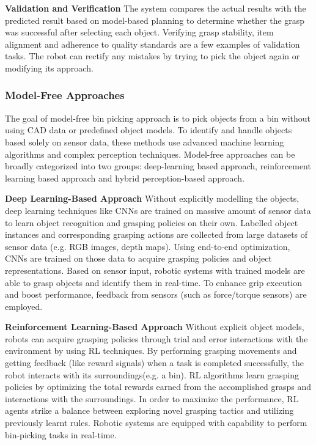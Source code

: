 \vspace{5mm}

\textbf{Validation and Verification} The system compares the actual results with the predicted result based on model-based planning to determine whether the grasp was successful after selecting each object. Verifying grasp stability, item alignment and adherence to quality standards are a few examples of validation tasks. The robot can rectify any mistakes by trying to pick the object again or modifying its approach.\cite{lin2020robotic}

\subsubsection{Model-Free Approaches}
The goal of model-free bin picking approach is to pick objects from a bin without using \ac{CAD} data or predefined object models. To identify and handle objects based solely on sensor data, these methods use advanced machine learning algorithms and complex perception techniques. Model-free approaches can be broadly categorized into two groups: deep-learning based approach\cite{bousmalis2018using}, reinforcement learning based approach\cite{levine2018learning} and hybrid perception-based approach\cite{jang2018grasp2vec}. 

\vspace{5mm}

\textbf{Deep Learning-Based Approach} Without explicitly modelling the objects, deep learning techniques like \ac{CNN}s are trained on massive amount of sensor data to learn object recognition and grasping policies on their own. Labelled object instances and corresponding grasping actions are collected from large datasets of sensor data (e.g. \ac{RGB} images, depth maps). Using end-to-end optimization, \ac{CNN}s are trained on those data to acquire grasping policies and object representations. Based on sensor input, robotic systems with trained models are able to grasp objects and identify them in real-time. To enhance grip execution and boost performance, feedback from sensors (such as force/torque sensors) are employed.\cite{bousmalis2018using}

\vspace{5mm}

\textbf{Reinforcement Learning-Based Approach} Without explicit object models, robots can acquire grasping policies through trial and error interactions with the environment by using \ac{RL} techniques. By performing grasping movements and getting feedback (like reward signals) when a task is completed successfully, the robot interacts with its surroundings(e.g. a bin). \ac{RL} algorithms learn grasping policies by optimizing the total rewards earned from the accomplished grasps and interactions with the surroundings. In order to maximize the performance, \ac{RL} agents strike a balance between exploring novel grasping tactics and utilizing previously learnt rules. Robotic systems are equipped with capability to perform bin-picking tasks in real-time.\cite{levine2018learning}


